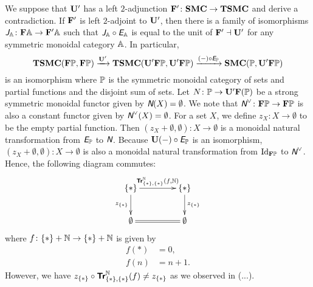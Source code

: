 We suppose that \(\mathbf{U}'\) has a left \(2\)-adjunction \(\mathbf{F}' \colon \mathbf{SMC}
\to \mathbf{TSMC}\) and derive a contradiction. If \(\mathbf{F}'\) is left
\(2\)-adjoint to \(\mathbf{U}'\), then there is a family of isomorphisms
\(\textit{\textsf{J}}_{\mathbb{A}} \colon \mathbf{F}\mathbb{A} \to \mathbf{F}'\mathbb{A}\) such that
\(\textit{\textsf{J}}_{\mathbb{A}} \circ \textit{\textsf{E}}_{\mathbb{A}}\) is equal to the unit
of \(\mathbf{F}' \dashv \mathbf{U}'\) for any symmetric monoidal category
\(\mathbb{A}\). In particular,
\begin{equation*}
  \mathbf{TSMC}(\mathbf{F}\mathbb{P},\mathbf{F}\mathbb{P}) \xrightarrow{\mathbf{U}'}
  \mathbf{TSMC}(\mathbf{U}'\mathbf{F}\mathbb{P},\mathbf{U}'\mathbf{F}\mathbb{P}) \xrightarrow{(-) \circ \textit{\textsf{E}}_{\mathbb{\mathbb{P}}}}
  \mathbf{SMC}(\mathbb{P},\mathbf{U}'\mathbf{F}\mathbb{P})
\end{equation*}
is an isomorphism where \(\mathbb{P}\) is the symmetric monoidal category of
sets and partial functions and the disjoint sum of sets. Let \(N
\colon \mathbb{P} \to \mathbf{U}'\mathbf{F}(\mathbb{P})\) be a strong symmetric monoidal functor
given by \(\textit{\textsf{N}}(X) = \emptyset\). We note that \(\textit{\textsf{N}}^{\vee} \colon \mathbf{F}\mathbb{P}
\to \mathbf{F}\mathbb{P}\) is also a constant functor given by \(\textit{\textsf{N}}^{\vee}(X) =
\emptyset\). For a set \(X\), we define \(z_{X} \colon X \to
\emptyset\) to be the empty partial function. Then \((z_{X} +
\emptyset,\emptyset) \colon X \to \emptyset\) is a monoidal natural
transformation from \(\textit{\textsf{E}}_{\mathbb{\mathbb{P}}}\) to \(\textit{\textsf{N}}\). Because \(\mathbf{U}(-) \circ
\textit{\textsf{E}}_{\mathbb{\mathbb{P}}}\) is an isomorphism, \((z_{X} + \emptyset,\emptyset)
\colon X \to \emptyset\) is also a monoidal natural transformation
from \(\mbox{Id}_{\mathbf{F}\mathbb{P}}\) to \(\textit{\textsf{N}}^{\vee}\). Hence, the following diagram
commutes:
\begin{equation*}
  \xymatrix@C=15mm{
    \{\ast\} \ar[r]^{\Tr{\NN}_{\{\ast\},\{\ast\}}(f,\NN)} \ar[d]_{z_{\{\ast\}}} &
    \{\ast\} \ar[d]^{z_{\{\ast\}}} \\
    \emptyset \ar@{=}[r] &
    \emptyset
  }
\end{equation*}
where \(f \colon \{\ast\} + \mathbb N \to \{\ast\} + \mathbb N\) is given by
\begin{align*}
  f(\ast) &= 0, \\
  f(n) &= n+1.
\end{align*}
However, we have \(z_{\{\ast\}} \circ {\normalfont\textsf{\textbf{Tr}}}^{\mathbb N}_{\{\ast\},\{\ast\}}(f) \neq z_{\{\ast\}}\)
as we observed in (...).
